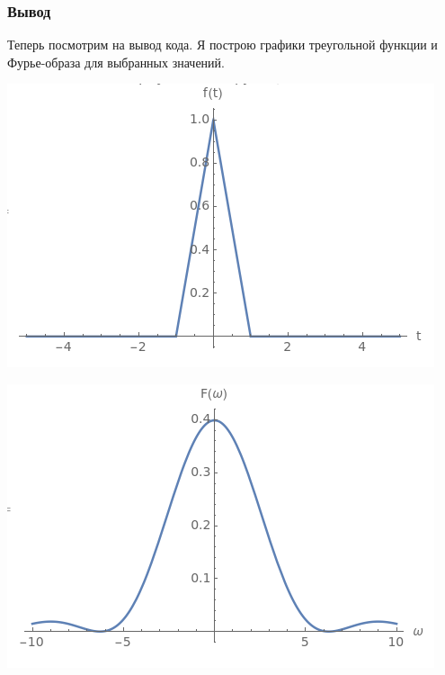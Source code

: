 \documentclass[a4paper,12pt]{article}
\begin{document}
\subsubsection{Вывод}
Теперь посмотрим на вывод кода. Я построю графики треугольной функции и Фурье-образа для выбранных значений.
\begin{center}
\begin{minipage}{0.48\textwidth}
  \centering
  \includegraphics[width=\linewidth]{images/2f11.png}
\end{minipage}
\hfill
\begin{minipage}{0.48\textwidth}
  \centering
  \includegraphics[width=\linewidth]{images/2F11.png}
\end{minipage}
\end{center}
\end{document}
